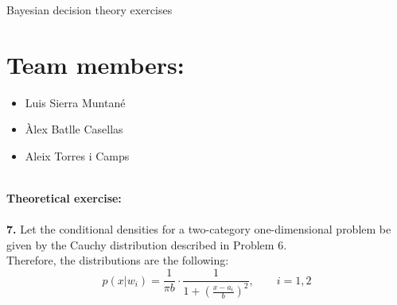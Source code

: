 \documentclass[10pt]{article}
\begin{document}
\begingroup
  \centering
  \Huge Bayesian decision theory exercises
  \vskip 1cm
\endgroup
\section{Team members:}
\begin{itemize}
  \item Luis Sierra Muntané
  \item Àlex Batlle Casellas
  \item Aleix Torres i Camps
\end{itemize}
\ \\
\Huge{\textbf{Theoretical exercise:}} \\ \ \\
\Large
\textbf{7.} Let the conditional densities for a two-category one-dimensional problem be given by the Cauchy distribution described in Problem 6. \\

\normalsize
Therefore, the distributions are the following:
$$
p(x|w_i)=\frac{1}{\pi b} \cdot \frac{1}{1 + \left(\frac{x-a_i}{b}\right)^2}, \qquad i=1,2
$$
\end{document}
